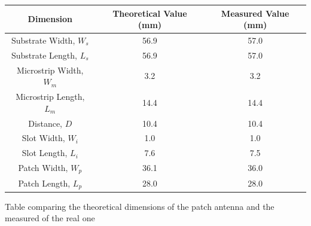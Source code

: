 \documentclass[]{article}
\begin{document}
\newpage

\begin{center}
	 \captionsetup{type=table} %
	\begin{tabular}{|c|c|c|}
		\hline
		\textbf{Dimension} & \textbf{Theoretical Value (mm)} & \textbf{Measured Value (mm)} \\
		\hline
		Substrate Width, $W_s$ & 56.9 & 57.0\\
		\hline
		Substrate Length, $L_s$ & 56.9 & 57.0\\
		\hline
		Microstrip Width, $W_m$ & 3.2 & 3.2\\
		\hline
		Microstrip Length, $L_m$ & 14.4& 14.4\\
		\hline
		Distance, $D$ & 10.4 & 10.4\\
		\hline
		Slot Width, $W_i$ & 1.0 & 1.0\\
		\hline
		Slot Length, $L_i$ & 7.6 & 7.5\\
		\hline
		Patch Width, $W_p$ & 36.1 & 36.0\\
		\hline
		Patch Length, $L_p$ & 28.0 & 28.0\\
		\hline
	\end{tabular}
	\caption{Table comparing the theoretical dimensions of the patch antenna and the measured of the real one}
	\label{tab:COMPARINGREALANDTEOR}
\end{center}

\end{document}
